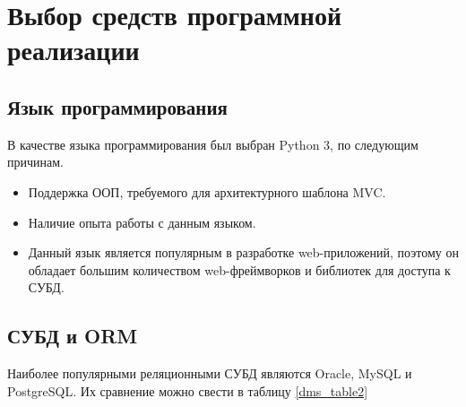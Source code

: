

\section{Выбор средств программной реализации}

\subsection{Язык программирования}
В качестве языка программирования был выбран Python 3\cite{python_doc}, по следующим причинам.
\begin{itemize}
	\item Поддержка ООП, требуемого для архитектурного шаблона MVC.
	\item Наличие опыта работы с данным языком.
	\item Данный язык является популярным в разработке web-приложений, поэтому он обладает большим количеством web-фреймворков и библиотек для доступа к СУБД.
\end{itemize}

\subsection{СУБД и ORM}
Наиболее популярными реляционными СУБД являются Oracle, MySQL и PostgreSQL\cite{dbm_source}. Их сравнение\cite{dbm_source2} можно свести в таблицу \ref{dms_table2}

